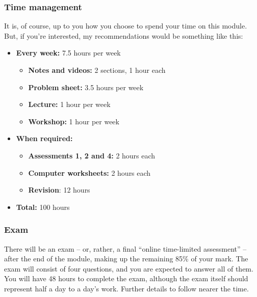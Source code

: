\documentclass[
  a4paper,
]{article}
\providecommand{\tightlist}{%
  \setlength{\itemsep}{0pt}\setlength{\parskip}{0pt}}
\theoremstyle{definition}
\theoremstyle{definition}
\theoremstyle{definition}
\theoremstyle{remark}
\begin{document}
\hypertarget{time}{%
\subsubsection*{Time management}\label{time}}

It is, of course, up to you how you choose to spend your time on this module. But, if you're interested, my recommendations would be something like this:

\begin{itemize}
\tightlist
\item
  \textbf{Every week:} 7.5 hours per week

  \begin{itemize}
  \tightlist
  \item
    \textbf{Notes and videos:} 2 sections, 1 hour each
  \item
    \textbf{Problem sheet:} 3.5 hours per week
  \item
    \textbf{Lecture:} 1 hour per week
  \item
    \textbf{Workshop:} 1 hour per week
  \end{itemize}
\item
  \textbf{When required:}

  \begin{itemize}
  \tightlist
  \item
    \textbf{Assessments 1, 2 and 4:} 2 hours each
  \item
    \textbf{Computer worksheets:} 2 hours each
  \item
    \textbf{Revision}: 12 hours
  \end{itemize}
\item
  \textbf{Total:} 100 hours
\end{itemize}

\hypertarget{exam}{%
\subsubsection*{Exam}\label{exam}}

There will be an exam -- or, rather, a final ``online time-limited assessment'' -- after the end of the module, making up the remaining 85\% of your mark. The exam will consist of four questions, and you are expected to answer all of them. You will have 48 hours to complete the exam, although the exam itself should represent half a day to a day's work. Further details to follow nearer the time.
\end{document}
